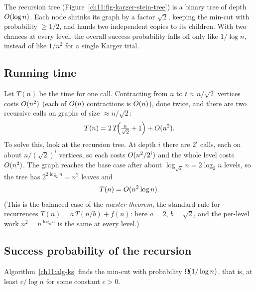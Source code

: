 \begin{intuitionbox}
The recursion tree (Figure~\ref{ch11:fig-karger-stein-tree}) is a binary tree of depth $O(\log n)$. Each node shrinks its graph by a factor $\sqrt2$, keeping the min-cut with probability $\ge 1/2$, and hands two independent copies to its children. With two chances at every level, the overall success probability falls off only like $1/\log n$, instead of like $1/n^2$ for a single Karger trial.
\end{intuitionbox}

\subsection{Running time}

Let $T(n)$ be the time for one call. Contracting from $n$ to $t\approx n/\sqrt2$ vertices costs $O(n^2)$ (each of $O(n)$ contractions is $O(n)$), done twice, and there are two recursive calls on graphs of size $\approx n/\sqrt2$:
\[
  T(n) = 2\,T\!\Big(\tfrac{n}{\sqrt2}+1\Big) + O(n^2).
\]
To solve this, look at the recursion tree. At depth $i$ there are $2^i$ calls, each on about $n/(\sqrt2)^i$ vertices, so each costs $O(n^2/2^i)$ and the whole level costs $O(n^2)$. The graph reaches the base case after about $\log_{\sqrt2} n = 2\log_2 n$ levels, so the tree has $2^{2\log_2 n}=n^2$ leaves and
\[
  T(n) = O(n^2\log n).
\]
(This is the balanced case of the \emph{master theorem}, the standard rule for recurrences $T(n)=a\,T(n/b)+f(n)$: here $a=2$, $b=\sqrt2$, and the per-level work $n^2=n^{\log_b a}$ is the same at every level.)

\subsection{Success probability of the recursion}

\begin{theorem}\label{ch11:thm-ks}
Algorithm~\ref{ch11:alg-ks} finds the min-cut with probability $\Omega\!\big(1/\log n\big)$, that is, at least $c/\log n$ for some constant $c>0$.
\end{theorem}

